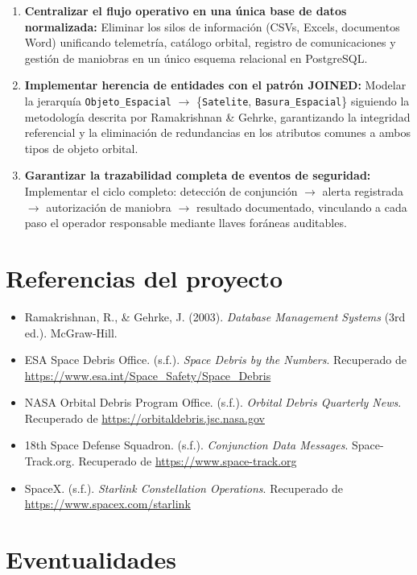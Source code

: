\begin{enumerate}
    \item \textbf{Centralizar el flujo operativo en una única base de datos normalizada:} Eliminar los silos de información (CSVs, Excels, documentos Word) unificando telemetría, catálogo orbital, registro de comunicaciones y gestión de maniobras en un único esquema relacional en PostgreSQL.
    \item \textbf{Implementar herencia de entidades con el patrón JOINED:} Modelar la jerarquía \texttt{Objeto\_Espacial} $\rightarrow$ \{\texttt{Satelite}, \texttt{Basura\_Espacial}\} siguiendo la metodología descrita por Ramakrishnan \& Gehrke, garantizando la integridad referencial y la eliminación de redundancias en los atributos comunes a ambos tipos de objeto orbital.
    \item \textbf{Garantizar la trazabilidad completa de eventos de seguridad:} Implementar el ciclo completo: detección de conjunción $\rightarrow$ alerta registrada $\rightarrow$ autorización de maniobra $\rightarrow$ resultado documentado, vinculando a cada paso el operador responsable mediante llaves foráneas auditables.
\end{enumerate}

\section{Referencias del proyecto}

\begin{itemize}
    \item Ramakrishnan, R., \& Gehrke, J. (2003). \textit{Database Management Systems} (3rd ed.). McGraw-Hill.
    \item ESA Space Debris Office. (s.f.). \textit{Space Debris by the Numbers}. Recuperado de \url{https://www.esa.int/Space\_Safety/Space\_Debris}
    \item NASA Orbital Debris Program Office. (s.f.). \textit{Orbital Debris Quarterly News}. Recuperado de \url{https://orbitaldebris.jsc.nasa.gov}
    \item 18th Space Defense Squadron. (s.f.). \textit{Conjunction Data Messages}. Space-Track.org. Recuperado de \url{https://www.space-track.org}
    \item SpaceX. (s.f.). \textit{Starlink Constellation Operations}. Recuperado de \url{https://www.spacex.com/starlink}
\end{itemize}

\section{Eventualidades}

